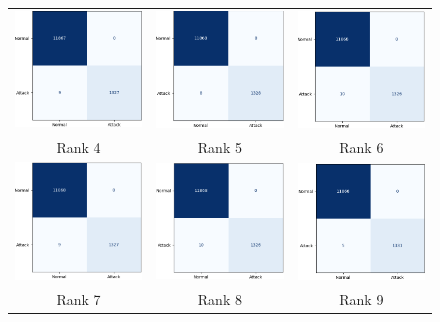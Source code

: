 \documentclass[pdflatex,sn-mathphys-num]{sn-jnl}
\theoremstyle{thmstyleone}
\theoremstyle{thmstyletwo}
\theoremstyle{thmstylethree}
\begin{document}
\begin{figure}[H]
    \centering
    \begin{tabular}{ccc}
        \includegraphics[width=0.3\linewidth]{rank_4.png} &
        \includegraphics[width=0.3\linewidth]{rank_5.png} &
        \includegraphics[width=0.3\linewidth]{rank_6.png} \\
        \small Rank 4 & \small Rank 5 & \small Rank 6 \\[3pt]

        \includegraphics[width=0.3\linewidth]{rank_7.png} &
        \includegraphics[width=0.3\linewidth]{rank_8.png} &
        \includegraphics[width=0.3\linewidth]{rank_9.png} \\
        \small Rank 7 & \small Rank 8 & \small Rank 9 \\[3pt]


\end{tabular}
\end{figure}
\end{document}
